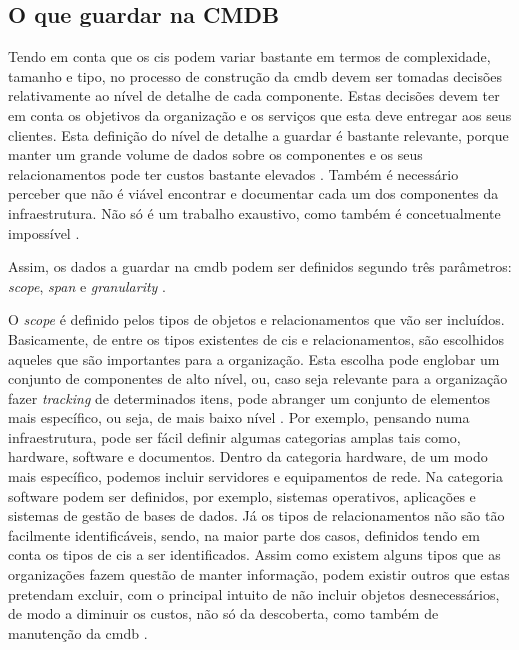 \documentclass[
  oneside,
  11pt, a4paper,
  footinclude=true,
  headinclude=true,
  cleardoublepage=empty
]{scrbook}
\begin{document}
\subsection{O que guardar na CMDB}

Tendo em conta que os \glspl{ci} podem variar bastante em termos de complexidade, tamanho e tipo, no processo de construção da \gls{cmdb} devem ser tomadas decisões relativamente ao nível de detalhe de cada componente. Estas decisões devem ter em conta os objetivos da organização e os serviços que esta deve entregar aos seus clientes. Esta definição do nível de detalhe a guardar é bastante relevante, porque manter um grande volume de dados sobre os componentes e os seus relacionamentos pode ter custos bastante elevados \cite{itil4}. Também é necessário perceber que não é viável encontrar e documentar cada um dos componentes da infraestrutura. Não só é um trabalho exaustivo, como também é concetualmente impossível \cite{cmdbsystems}.

Assim, os dados a guardar na \gls{cmdb} podem ser definidos segundo três parâmetros: \textit{scope}, \textit{span} e \textit{granularity} \cite{implementingitil}.

O \textit{scope} é definido pelos tipos de objetos e relacionamentos que vão ser incluídos. Basicamente, de entre os tipos existentes de \glspl{ci} e relacionamentos, são escolhidos aqueles que são importantes para a organização. Esta escolha pode englobar um conjunto de componentes de alto nível, ou, caso seja relevante para a organização fazer \textit{tracking} de determinados itens, pode abranger um conjunto de elementos mais específico, ou seja, de mais baixo nível \cite{owen2019operation}. Por exemplo, pensando numa infraestrutura, pode ser fácil definir algumas categorias amplas tais como, hardware, software e documentos. Dentro da categoria hardware, de um modo mais específico, podemos incluir servidores e equipamentos de rede. Na categoria software podem ser definidos, por exemplo, sistemas operativos, aplicações e sistemas de gestão de bases de dados. Já os tipos de relacionamentos não são tão facilmente identificáveis, sendo, na maior parte dos casos, definidos tendo em conta os tipos de \glspl{ci} a ser identificados. Assim como existem alguns tipos que as organizações fazem questão de manter informação, podem existir outros que estas pretendam excluir, com o principal intuito de não incluir objetos desnecessários, de modo a diminuir os custos, não só da descoberta, como também de manutenção da \gls{cmdb} \cite{implementingitil}.
\end{document}

